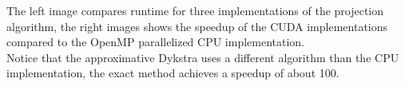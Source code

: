 \documentclass{tikzposter} %
\begin{document}
\begin{columns}
{		The left image compares runtime for three implementations of the projection algorithm, the right images shows the
		speedup of the CUDA implementations compared to the OpenMP parallelized CPU implementation. \\
		Notice that the approximative Dykstra uses a different algorithm than the CPU implementation, the exact method achieves a
		speedup of about 100.
		}





	\end{columns}
	
\end{document}
